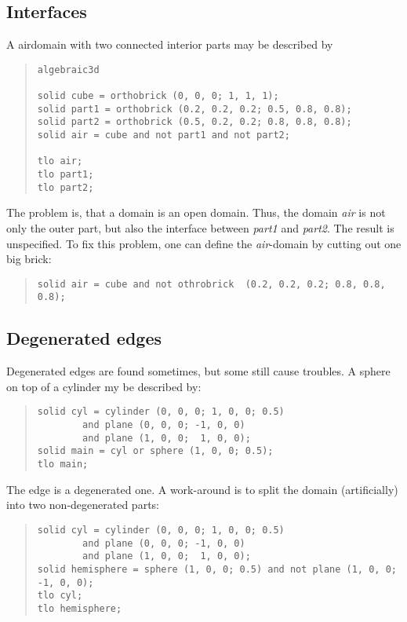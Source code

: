 \documentclass[12pt]{book}
\begin{document}
\subsection{Interfaces}
A airdomain with two connected interior parts may be described by
\begin{quote}
\begin{verbatim}
algebraic3d

solid cube = orthobrick (0, 0, 0; 1, 1, 1);
solid part1 = orthobrick (0.2, 0.2, 0.2; 0.5, 0.8, 0.8);
solid part2 = orthobrick (0.5, 0.2, 0.2; 0.8, 0.8, 0.8);
solid air = cube and not part1 and not part2;

tlo air;
tlo part1;
tlo part2;
\end{verbatim}
\end{quote}
The problem is, that a domain is an open domain. Thus, the domain
{\it air} is not only the outer part, but also the interface between
{\it part1} and {\it part2}. The result is unspecified. To fix this
problem, one can define the {\it air}-domain by cutting out one big
brick:
\begin{quote}
\begin{verbatim}
solid air = cube and not othrobrick  (0.2, 0.2, 0.2; 0.8, 0.8, 0.8);
\end{verbatim}
\end{quote}

\subsection{Degenerated edges}
Degenerated edges are found sometimes, but some still cause troubles.
A sphere on top of a cylinder my be described by:
\begin{quote}
\begin{verbatim}
solid cyl = cylinder (0, 0, 0; 1, 0, 0; 0.5)
        and plane (0, 0, 0; -1, 0, 0)
        and plane (1, 0, 0;  1, 0, 0);
solid main = cyl or sphere (1, 0, 0; 0.5);
tlo main;
\end{verbatim}
\end{quote}
The edge is a degenerated one. A work-around is to split the 
domain (artificially) into two non-degenerated parts:
\begin{quote}
\begin{verbatim}
solid cyl = cylinder (0, 0, 0; 1, 0, 0; 0.5)
        and plane (0, 0, 0; -1, 0, 0)
        and plane (1, 0, 0;  1, 0, 0);
solid hemisphere = sphere (1, 0, 0; 0.5) and not plane (1, 0, 0; -1, 0, 0);
tlo cyl;
tlo hemisphere;
\end{verbatim}
\end{quote}
\end{document}
